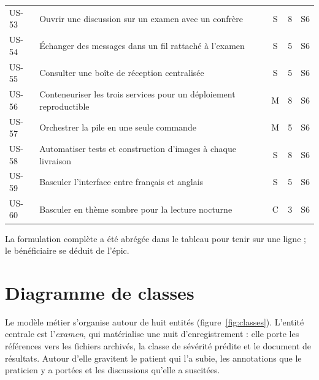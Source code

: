 \begin{longtable}{@{}p{1.25cm}L{9.1cm}cp{0.75cm}p{0.9cm}@{}}
US-53 & Ouvrir une discussion sur un examen avec un confrère & S & 8 & S6 \\
US-54 & Échanger des messages dans un fil rattaché à l'examen & S & 5 & S6 \\
US-55 & Consulter une boîte de réception centralisée & S & 5 & S6 \\

US-56 & Conteneuriser les trois services pour un déploiement reproductible
& M & 8 & S6 \\
US-57 & Orchestrer la pile en une seule commande & M & 5 & S6 \\
US-58 & Automatiser tests et construction d'images à chaque livraison & S & 8 & S6 \\
US-59 & Basculer l'interface entre français et anglais & S & 5 & S6 \\
US-60 & Basculer en thème sombre pour la lecture nocturne & C & 3 & S6 \\
\end{longtable}

\noindent
La formulation complète a été abrégée dans le tableau pour tenir sur une ligne ; le
bénéficiaire se déduit de l'épic.

\section{Diagramme de classes}

Le modèle métier s'organise autour de huit entités (figure~\ref{fig:classes}).
L'entité centrale est l'\emph{examen}, qui matérialise une nuit d'enregistrement : elle
porte les références vers les fichiers archivés, la classe de sévérité prédite et le
document de résultats. Autour d'elle gravitent le patient qui l'a subie, les annotations
que le praticien y a portées et les discussions qu'elle a suscitées.

